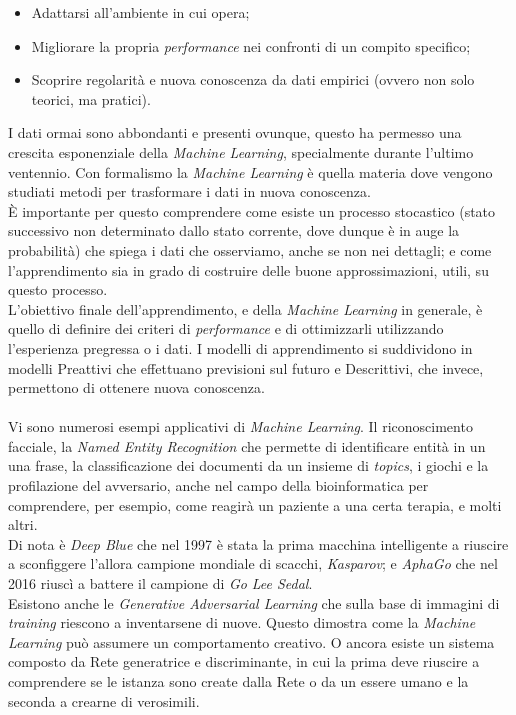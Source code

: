 \documentclass[10pt,a4paper]{book}
\begin{document}
\begin{itemize}
\item Adattarsi all'ambiente in cui opera;
\item Migliorare la propria \textit{performance} nei confronti di un compito specifico;
\item Scoprire regolarit\`a e nuova conoscenza da dati empirici (ovvero non solo teorici, ma pratici).
\end{itemize}
I dati ormai sono abbondanti e presenti ovunque, questo ha permesso una crescita esponenziale della \textit{Machine Learning}, specialmente durante l'ultimo ventennio. Con formalismo la \textit{Machine Learning} \`e quella materia dove vengono studiati metodi per trasformare i dati in nuova conoscenza.\\
\`E importante per questo comprendere come esiste un processo stocastico (stato successivo non determinato dallo stato corrente, dove dunque \`e in auge la probabilit\`a) che spiega i dati che osserviamo, anche se non nei dettagli; e come l'apprendimento sia in grado di costruire delle buone approssimazioni, utili, su questo processo.\\
L'obiettivo finale dell'apprendimento, e della \textit{Machine Learning} in generale, \`e quello di definire dei criteri di \textit{performance} e di ottimizzarli utilizzando l'esperienza pregressa o i dati. I modelli di apprendimento si suddividono in modelli Preattivi che effettuano previsioni sul futuro e Descrittivi, che invece, permettono di ottenere nuova conoscenza.\\\\
Vi sono numerosi esempi applicativi di \textit{Machine Learning}. Il riconoscimento facciale, la \textit{Named Entity Recognition} che permette di identificare entit\`a in un una frase, la classificazione dei documenti da un insieme di \textit{topics}, i giochi e la profilazione del avversario, anche nel campo della bioinformatica per comprendere, per esempio, come reagir\`a un paziente a una certa terapia, e molti altri.\\
Di nota \`e \textit{Deep Blue} che nel 1997 \`e stata la prima macchina intelligente a riuscire a sconfiggere l'allora campione mondiale di scacchi, \textit{Kasparov}; e \textit{AphaGo} che nel 2016 riusc\`i a battere il campione di \textit{Go} \textit{Lee Sedal}.\\
Esistono anche le \textit{Generative Adversarial Learning} che sulla base di immagini di \textit{training} riescono a inventarsene di nuove. Questo dimostra come la \textit{Machine Learning} pu\`o assumere un comportamento creativo. O ancora esiste un sistema composto da Rete generatrice e discriminante, in cui la prima deve riuscire a comprendere se le istanza  sono create dalla Rete o da un essere umano e la seconda a crearne di verosimili.
\end{document}
